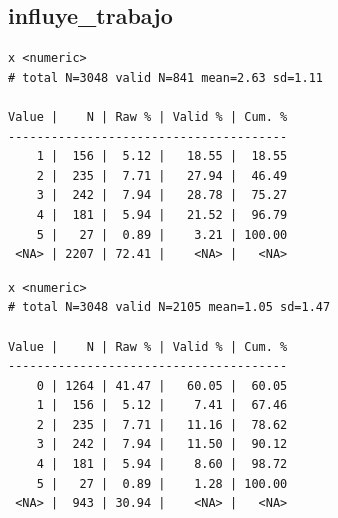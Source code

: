 \documentclass[
  letterpaper,
  DIV=11,
  numbers=noendperiod]{scrreprt}
\newenvironment{Shaded}{\begin{snugshade}}{\end{snugshade}}
\newcommand{\AttributeTok}[1]{\textcolor[rgb]{0.40,0.45,0.13}{#1}}
\newcommand{\DecValTok}[1]{\textcolor[rgb]{0.68,0.00,0.00}{#1}}
\newcommand{\FunctionTok}[1]{\textcolor[rgb]{0.28,0.35,0.67}{#1}}
\newcommand{\NormalTok}[1]{\textcolor[rgb]{0.00,0.23,0.31}{#1}}
\newcommand{\OtherTok}[1]{\textcolor[rgb]{0.00,0.23,0.31}{#1}}
\newcommand{\SpecialCharTok}[1]{\textcolor[rgb]{0.37,0.37,0.37}{#1}}
\begin{document}
\hypertarget{influye_trabajo}{%
\subsection{influye\_trabajo}\label{influye_trabajo}}

\begin{Shaded}
\end{Shaded}

\begin{verbatim}
x <numeric> 
# total N=3048 valid N=841 mean=2.63 sd=1.11

Value |    N | Raw % | Valid % | Cum. %
---------------------------------------
    1 |  156 |  5.12 |   18.55 |  18.55
    2 |  235 |  7.71 |   27.94 |  46.49
    3 |  242 |  7.94 |   28.78 |  75.27
    4 |  181 |  5.94 |   21.52 |  96.79
    5 |   27 |  0.89 |    3.21 | 100.00
 <NA> | 2207 | 72.41 |    <NA> |   <NA>
\end{verbatim}

\begin{Shaded}
\end{Shaded}

\begin{verbatim}
x <numeric> 
# total N=3048 valid N=2105 mean=1.05 sd=1.47

Value |    N | Raw % | Valid % | Cum. %
---------------------------------------
    0 | 1264 | 41.47 |   60.05 |  60.05
    1 |  156 |  5.12 |    7.41 |  67.46
    2 |  235 |  7.71 |   11.16 |  78.62
    3 |  242 |  7.94 |   11.50 |  90.12
    4 |  181 |  5.94 |    8.60 |  98.72
    5 |   27 |  0.89 |    1.28 | 100.00
 <NA> |  943 | 30.94 |    <NA> |   <NA>
\end{verbatim}
\end{document}
